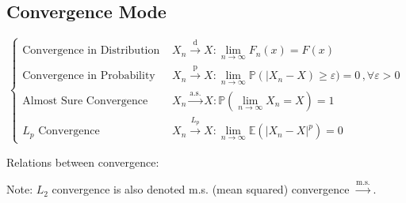 \subsection{Convergence Mode}
    \begin{equation}
        \begin{cases}
            \text{Convergence in Distribution }&{\displaystyle X_n\xrightarrow[]{\mathrm{d}}X:\lim_{n\to\infty}F_n(x)=F(x)}\\
            \text{Convergence in Probability }&{\displaystyle X_n\xrightarrow[]{\mathrm{p}}X:\lim_{n\to\infty}\mathbb{P}(|X_n-X)\geq\varepsilon)=0\, ,\forall\varepsilon>0}\\
            \text{Almost Sure Convergence }&{\displaystyle X_n\xrightarrow[]{\text{a.s.}}X:\mathbb{P}(\lim_{n\to\infty}X_n=X)=1}\\
            L_p\text{ Convergence }&{\displaystyle X_n\xrightarrow[]{L_p}X:\lim_{n\to\infty}\mathbb{E}(|X_n-X|^p)=0}
        \end{cases}
    \end{equation}

        Relations between convergence:
        \begin{center}
        \end{center}

        Note: $ L_2 $ convergence is also denoted m.s. (mean squared) convergence $ \xrightarrow[]{\mathrm{m.s.}}  $.

